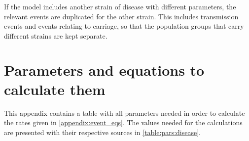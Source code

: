 \documentclass[10pt,a4paper]{article}
\begin{document}
\begin{appendices}
\begin{longtable}{p{3.5cm}|l|l|p{4cm}}
\end{longtable}

If the model includes another strain of disease with different parameters, the relevant events are duplicated for the other strain. This includes transmission events and events relating to carriage, so that the population groups that carry different strains are kept separate.


\section{Parameters and equations to calculate them} \label{appendix:equations}

This appendix contains a table with all parameters needed in order to calculate the rates given in \cref{appendix:event_eqs}. The values needed for the calculations are presented with their respective sources in \cref{table:pars:disease}.


\end{appendices}
\end{document}
